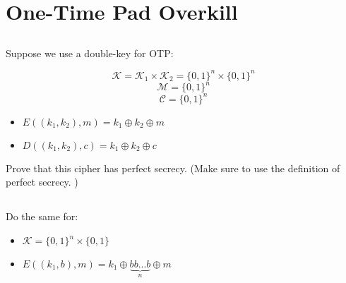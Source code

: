 \documentclass[12pt]{article}
\begin{document}
\vspace{2em}





\section{One-Time Pad Overkill}

\subsection{}


Suppose we use a double-key for OTP:

$$\mathcal{K} = \mathcal{K}_1 \times \mathcal{K}_2 = \{0, 1\}^n \times \{0, 1\}^n$$
$$\mathcal{M} = \{0, 1\}^n$$
$$\mathcal{C} = \{0, 1\}^n$$

\begin{itemize}
\item $E((k_1, k_2), m)  = k_1 \oplus k_2 \oplus m$
\item $D((k_1, k_2), c)  = k_1 \oplus k_2 \oplus c$
\end{itemize}

Prove that this cipher has perfect secrecy. (Make sure to use the definition of perfect secrecy.
)




\subsection{}

Do the same for:

\begin{itemize}
\item $\mathcal{K} = \{0, 1\}^n \times \{0, 1\}$
\item $E((k_1, b), m)  = k_1 \oplus \underset{n}{\underbrace{bb...b}} \oplus m$
\end{itemize}
\end{document}
